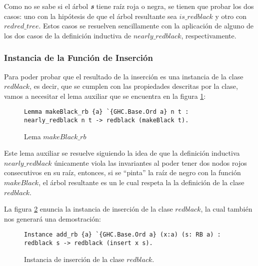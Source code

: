 Como no se sabe si el \'arbol \textit{\textbf{s}} tiene ra\'iz roja o negra, se tienen que probar 
los dos casos: uno con la hipótesis de que el \'arbol resultante sea 
\hyperref[inductive_isRedB]{$is\_redblack$} y otro con \hyperref[inductive_isRedB]{$redred\_tree$}. 
Estos casos se resuelven sencillamente con la aplicación de alguno de los dos casos de la 
definici\'on inductiva de \hyperref[inductive_isRedB]{$nearly\_redblack$}, respectivamente.

\subsubsection{Instancia de la Funci\'on de Inserci\'on}

Para poder probar que el resultado de la inserci\'on es una instancia de la clase 
\hyperref[class_rb]{$redblack$}, es decir, que se cumplen con las propiedades descritas por la 
clase, vamos a necesitar el lema auxiliar que se encuentra en la figura \ref{lema_3}:
\begin{figure}[!ht]
\centering
\captionsetup{justification=centering}
\begin{verbatim}
Lemma makeBlack_rb {a} `{GHC.Base.Ord a} n t :
nearly_redblack n t -> redblack (makeBlack t).
\end{verbatim}
\caption{Lema $makeBlack\_rb$}
\label{lema_3}
\end{figure}

Este lema auxiliar se resuelve siguiendo la idea de que la definici\'on inductiva 
\hyperref[inductive_isRedB]{$nearly\_redblack$} únicamente viola las invariantes al poder tener dos 
nodos rojos consecutivos en su raíz, entonces, si se ``pinta'' la raíz de negro con la función 
\hyperref[raiz_negra_func]{$makeBlack$}, el \'arbol resultante es un {\arn} le cual respeta la la 
definición de la clase \hyperref[class_rb]{$redblack$}.

La figura \ref{instance_ins} enuncia la instancia de inserci\'on de la clase 
\hyperref[class_rb]{$redblack$}, la cual también nos generar\'a una demostraci\'on:

\begin{figure}[!ht]
\centering
\captionsetup{justification=centering}
\begin{verbatim}
Instance add_rb {a} `{GHC.Base.Ord a} (x:a) (s: RB a) :
redblack s -> redblack (insert x s).
\end{verbatim}
\caption{Instancia de inserci\'on de la clase \hyperref[class_rb]{$redblack$}.}
\label{instance_ins}
\end{figure}

